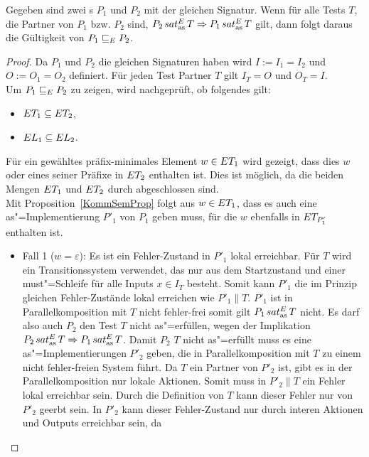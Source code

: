 \begin{Lem}
  \label{KommTestVerfeinLem}
  Gegeben sind zwei \MEIO{}s $P_1$ und $P_2$ mit der gleichen Signatur. Wenn
  für alle Tests $T$, die Partner von $P_1$ bzw. $P_2$ sind, $P_2\hspace{0.05cm}sat_\mathrm{as}^E\hspace{0.05cm} T
  \Rightarrow P_1\hspace{0.05cm}sat_\mathrm{as}^E\hspace{0.05cm} T$ gilt, dann folgt daraus die Gültigkeit von $P_1 \sqsubseteq  _E
  P_2$.
\end{Lem}
\begin{proof}
  Da $P_1$ und $P_2$ die gleichen Signaturen haben wird $I:=I_1=I_2$ und $O:=
  O_1=O_2$ definiert. Für jeden Test Partner $T$ gilt $I_T=O$ und $O_T=I$.\\
  Um $P_1 \sqsubseteq  _E P_2$ zu zeigen, wird nachgeprüft, ob folgendes gilt:
  \begin{itemize}
    \item $ET _1\subseteq ET _2$,
    \item $EL _1\subseteq EL _2$.
  \end{itemize}
  Für ein gewähltes präfix-minimales Element $w\in ET _1$ wird gezeigt, dass
  dies $w$ oder eines seiner Präfixe in $ET _2$ enthalten ist. Dies ist
  möglich, da die beiden Mengen $ET _1$ und $ET _2$ durch \cont{}
  abgeschlossen sind.\\
  Mit Proposition~\ref{KommSemProp} folgt aus $w\in ET _1$, dass es auch eine
  as"=Implementierung $P'_1$ von $P_1$ geben muss, für die $w$ ebenfalls in
  $ET _{P'_1}$ enthalten ist.
  \begin{itemize}
    \item Fall 1 ($w=\varepsilon$): Es ist ein Fehler-Zustand in $P'_1$ lokal
      erreichbar. Für $T$ wird ein Transitionssystem verwendet, das nur aus dem
      Startzustand und einer must"=Schleife für alle Inputs $x\in I_T$ besteht.
      Somit kann $P'_1$ die im Prinzip gleichen Fehler-Zustände lokal
      erreichen wie $P'_1\|T$. $P'_1$ ist in Parallelkomposition mit $T$ nicht
      fehler-frei somit gilt $P_1\hspace{0.05cm}sat_\mathrm{as}^E\hspace{0.05cm} T$ nicht. Es darf also auch $P_2$ den
      Test $T$ nicht as"=erfüllen, wegen der Implikation $P_2\hspace{0.05cm}sat_\mathrm{as}^E\hspace{0.05cm} T
      \Rightarrow P_1\hspace{0.05cm}sat_\mathrm{as}^E\hspace{0.05cm} T$. Damit $P_2$ $T$ nicht as"=erfüllt muss es eine
      as"=Implementierungen $P'_2$ geben, die in Parallelkomposition mit $T$ zu
      einem nicht fehler-freien System führt. Da $T$ ein Partner von $P'_2$
      ist, gibt es in der Parallelkomposition nur lokale Aktionen. Somit muss
      in $P'_2\|T$ ein Fehler lokal erreichbar sein. Durch die Definition von
      $T$ kann dieser Fehler nur von $P'_2$ geerbt sein. In $P'_2$ kann dieser
      Fehler-Zustand nur durch interen Aktionen und Outputs erreichbar sein, da

\end{itemize}
\end{proof}
